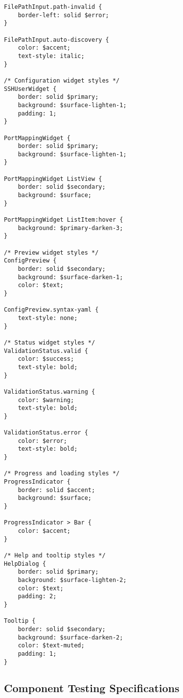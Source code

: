 \documentclass[11pt,a4paper]{article}
\begin{document}
\begin{lstlisting}[caption={ConfigPreview Implementation}]
FilePathInput.path-invalid {
    border-left: solid $error;
}

FilePathInput.auto-discovery {
    color: $accent;
    text-style: italic;
}

/* Configuration widget styles */
SSHUserWidget {
    border: solid $primary;
    background: $surface-lighten-1;
    padding: 1;
}

PortMappingWidget {
    border: solid $primary;
    background: $surface-lighten-1;
}

PortMappingWidget ListView {
    border: solid $secondary;
    background: $surface;
}

PortMappingWidget ListItem:hover {
    background: $primary-darken-3;
}

/* Preview widget styles */
ConfigPreview {
    border: solid $secondary;
    background: $surface-darken-1;
    color: $text;
}

ConfigPreview.syntax-yaml {
    text-style: none;
}

/* Status widget styles */
ValidationStatus.valid {
    color: $success;
    text-style: bold;
}

ValidationStatus.warning {
    color: $warning;
    text-style: bold;
}

ValidationStatus.error {
    color: $error;
    text-style: bold;
}

/* Progress and loading styles */
ProgressIndicator {
    border: solid $accent;
    background: $surface;
}

ProgressIndicator > Bar {
    color: $accent;
}

/* Help and tooltip styles */
HelpDialog {
    border: solid $primary;
    background: $surface-lighten-2;
    color: $text;
    padding: 2;
}

Tooltip {
    border: solid $secondary;
    background: $surface-darken-2;
    color: $text-muted;
    padding: 1;
}
\end{lstlisting}

\subsection{Component Testing Specifications}
\end{document}
